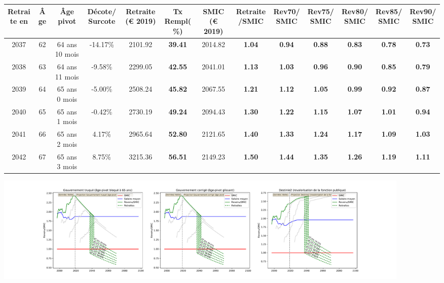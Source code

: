 { \scriptsize \begin{center} 
\begin{tabular}[htb]{|c|c||c|c||c|c||c||c|c|c|c|c|c|} 
\hline 
 Retraite en &  Âge &  Âge pivot &  Décote/Surcote &  Retraite (\euro{} 2019) &  Tx Rempl(\%) &  SMIC (\euro{} 2019) &  Retraite/SMIC &  Rev70/SMIC &  Rev75/SMIC &  Rev80/SMIC &  Rev85/SMIC &  Rev90/SMIC \\ 
\hline \hline 
 2037 &  62 &  64 ans 10 mois &  -14.17\% &  2101.92 &  {\bf 39.41} &  2014.82 &  {\bf 1.04} &  {\bf {\color{red} 0.94}} &  {\bf {\color{red} 0.88}} &  {\bf {\color{red} 0.83}} &  {\bf {\color{red} 0.78}} &  {\bf {\color{red} 0.73}} \\ 
\hline 
 2038 &  63 &  64 ans 11 mois &  -9.58\% &  2299.05 &  {\bf 42.55} &  2041.01 &  {\bf 1.13} &  {\bf 1.03} &  {\bf {\color{red} 0.96}} &  {\bf {\color{red} 0.90}} &  {\bf {\color{red} 0.85}} &  {\bf {\color{red} 0.79}} \\ 
\hline 
 2039 &  64 &  65 ans 0 mois &  -5.00\% &  2508.24 &  {\bf 45.82} &  2067.55 &  {\bf 1.21} &  {\bf 1.12} &  {\bf 1.05} &  {\bf {\color{red} 0.99}} &  {\bf {\color{red} 0.92}} &  {\bf {\color{red} 0.87}} \\ 
\hline 
 2040 &  65 &  65 ans 1 mois &  -0.42\% &  2730.19 &  {\bf 49.24} &  2094.43 &  {\bf 1.30} &  {\bf 1.22} &  {\bf 1.15} &  {\bf 1.07} &  {\bf 1.01} &  {\bf {\color{red} 0.94}} \\ 
\hline 
 2041 &  66 &  65 ans 2 mois &  4.17\% &  2965.64 &  {\bf 52.80} &  2121.65 &  {\bf 1.40} &  {\bf 1.33} &  {\bf 1.24} &  {\bf 1.17} &  {\bf 1.09} &  {\bf 1.03} \\ 
\hline 
 2042 &  67 &  65 ans 3 mois &  8.75\% &  3215.36 &  {\bf 56.51} &  2149.23 &  {\bf 1.50} &  {\bf 1.44} &  {\bf 1.35} &  {\bf 1.26} &  {\bf 1.19} &  {\bf 1.11} \\ 
\hline 
\hline 
\end{tabular} 
\end{center} } 

 \begin{center}\includegraphics[width=0.9\textwidth]{fig/ProfEcoles_1975_22_dest_retraite.pdf}\end{center} \label{fig/ProfEcoles_1975_22_dest_retraite.pdf} 

